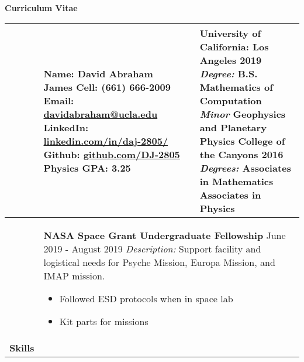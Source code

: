 \documentclass[10pt]{article}
\newcommand*\leftright[2]{%
  \leavevmode
  \rlap{#1}%
  \hspace{0.5\linewidth}%
  #2}
\begin{document}
{\centering
    \textbf{\large Curriculum Vitae} \\
}
\begin{longtable}{l l l l} \hline
    \multicolumn{1}{p{1.7 cm}}{\textbf{\vspace{Contact Info.}}}    &    
    
        \multicolumn{1}{p{7cm}}{
        \textbf{Name:} David Abraham James \newline
        \textbf{Cell: } (661) 666-2009 \newline
        \textbf{Email: } \href{mailto:davidabraham@ucla.edu}{davidabraham@ucla.edu} \newline
        \textbf{LinkedIn: } \href{https://www.linkedin.com/in/daj-2805/}{linkedin.com/in/daj-2805/} \newline
        \textbf{Github: } \href{https://github.com/DJ-2805}{github.com/DJ-2805} \newline
        \textbf{Physics GPA: } 3.25 } &
        \multicolumn{1}{p{1.5cm}}{\textbf{\vspace{Education}}}  &
            \multicolumn{1}{p{7.4cm}}{
            \textbf{University of California: Los Angeles 2019} \newline
            \textit{Degree:} B.S. Mathematics of Computation \newline
            \textit{Minor} Geophysics and Planetary Physics \newline
            \textbf{College of the Canyons 2016} \newline
            \textit{Degrees:} Associates in Mathematics \newline 
            Associates in Physics} \\ \hline
        
    \multicolumn{1}{p{1.7 cm}}{\textbf{\vspace{Awards}}}    &                
    
        \multicolumn{3}{p{17cm}}{
        \textbf{NASA Space Grant Undergraduate Fellowship} \newline
        \leftright{\textit{Lab Assistant}}{June 2019 - August 2019} \newline
        \textit{Description:} Support facility and logistical needs for Psyche Mission, Europa Mission, and IMAP mission.
        \begin{itemize}[noitemsep,nolistsep]
            \item Followed ESD protocols when in space lab
            \item Kit parts for missions
        \end{itemize}
       \baselineskip } \\ \hline
    \multicolumn{1}{p{1.7cm}}{\textbf{Skills}}   &
    

\end{longtable}
\end{document}
